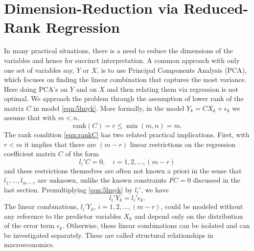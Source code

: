 \section{Dimension-Reduction via Reduced-Rank Regression \label{sec:s_dr}}


In many practical situations, there is a need to reduce the dimensions of the variables and hence for succinct interpretation. A common approach with only one set of variables say, $Y$ or $X$, is to use Principal Components Analysis (PCA), which focuses on finding the linear combination that captures the most variance. Here doing PCA's on $Y$ and on $X$ and then relating them via regression is not optimal. We approach the problem through the assumption of lower rank of the matrix $C$ in model \eqref{eqn:5lmyk}. More formally, in the model $Y_k= CX_k + \epsilon_k$ we assume that with $m < n$,
	\begin{equation} \label{eqn:rankC}
	\text{rank}(C)= r \leq \min(m,n)= m.
	\end{equation}
The rank condition \eqref{eqn:rankC} has two related practical implications. First, with $r < m$ it implies that there are $(m - r)$ linear restrictions on the regression coefficient matrix $C$ of the form
	\begin{equation} \label{eqn:lprimeC}
	l_i' C= 0, \quad i=1,2,\ldots,(m-r)
	\end{equation}
and these restrictions themselves are often not known a priori in the sense that $l_1, \ldots, l_{m-r}$ are unknown, unlike the known constraints $FC=0$ discussed in the last section. Premultiplying \eqref{eqn:5lmyk} by $l_i'$, we have
	\begin{equation} \label{eqn:lprimeY}
	l_i' Y_k= l_i' \epsilon_k.
	\end{equation}
The linear combinations, $l_i'Y_k$, $i=1,2,\ldots,(m-r)$, could be modeled without any reference to the predictor variables $X_k$ and depend only on the distribution of the error term $\epsilon_k$. Otherwise, these linear combinations can be isolated and can be investigated separately. These are called structural relationships in macroeconomics. 


